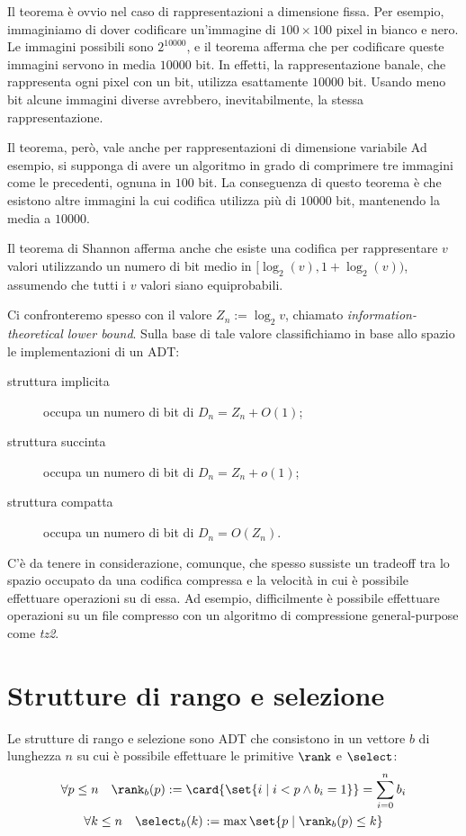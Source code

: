 Il teorema è ovvio nel caso di rappresentazioni a dimensione fissa.
Per esempio, immaginiamo di dover codificare un'immagine di $100\times100$ pixel in bianco e nero.
Le immagini possibili sono $2^{10000}$, e il teorema afferma che per codificare queste immagini servono in media $10000$ bit.
In effetti, la rappresentazione banale, che rappresenta ogni pixel con un bit, utilizza esattamente $10000$ bit.
Usando meno bit alcune immagini diverse avrebbero, inevitabilmente, la stessa rappresentazione.

Il teorema, però, vale anche per rappresentazioni di dimensione variabile
Ad esempio, si supponga di avere un algoritmo in grado di comprimere tre immagini come le precedenti, ognuna in $100$ bit.
La conseguenza di questo teorema è che esistono altre immagini la cui codifica utilizza più di $10000$ bit, mantenendo la media a $10000$.

Il teorema di Shannon afferma anche che esiste una codifica per rappresentare $v$ valori utilizzando un numero di bit medio in $[\log_2(v),1+\log_2(v))$, assumendo che tutti i $v$ valori siano equiprobabili.

Ci confronteremo spesso con il valore $Z_n:=\log_2 v$, chiamato \emph{information-theoretical lower bound}.
Sulla base di tale valore classifichiamo in base allo spazio le implementazioni di un ADT:
\begin{description}
	\item[struttura implicita] occupa un numero di bit di $D_n=Z_n+O(1)$;
	\item[struttura succinta] occupa un numero di bit di $D_n=Z_n+o(1)$;
	\item[struttura compatta] occupa un numero di bit di $D_n=O(Z_n)$.
\end{description}

C'è da tenere in considerazione, comunque, che spesso sussiste un tradeoff tra lo spazio occupato da una codifica compressa e la velocità in cui è possibile effettuare operazioni su di essa.
Ad esempio, difficilmente è possibile effettuare operazioni su un file compresso con un algoritmo di compressione general-purpose come \textit{tz2}.



\section{Strutture di rango e selezione}
Le strutture di rango e selezione sono ADT che consistono in un vettore $b$ di lunghezza $n$ su cui è possibile effettuare le primitive $\rank$ e $\select$:
\begin{gather*}
	\forall p\leq n\quad \rank_b(p) := \card{\set{i\mid i<p\land b_i=1}} = \sum_{i=0}^n b_i \\
	\forall k\leq n\quad \select_b(k) := \max\set{p\mid \rank_b(p)\leq k}
\end{gather*}

